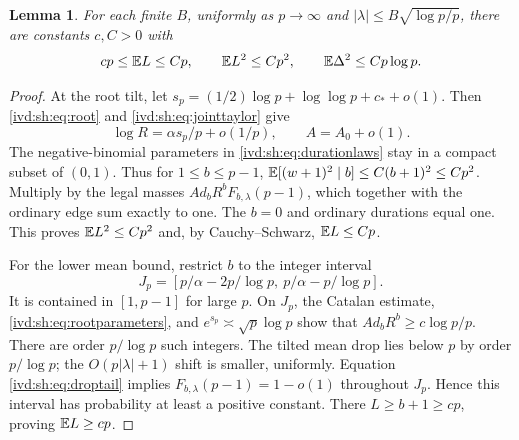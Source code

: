 \documentclass[11pt,letterpaper]{article}
\newtheorem{lemma}[theorem]{Lemma}
\theoremstyle{remark}\newtheorem{remark}[theorem]{Remark}
\numberwithin{equation}{section}
\begin{document}
\begin{lemma}\label{ivd:sh:lem:moments}
For each finite $B$, uniformly as $p\to\infty$ and
$|\lambda|\le B\sqrt{\log p/p}$, there are constants $c,C>0$ with
\begin{equation}\label{ivd:sh:eq:moments}
 cp\le\mathbb E L\le Cp,\qquad
 \mathbb E L^2\le Cp^2,\qquad \mathbb E\Delta^2\le Cp\log p.
\end{equation}
\end{lemma}
\begin{proof}
At the root tilt, let
$s_p=(1/2)\log p+\log\log p+c_*+o(1)$.
Then \eqref{ivd:sh:eq:root} and \eqref{ivd:sh:eq:jointtaylor} give
\begin{equation}\label{ivd:sh:eq:rootparameters}
 \log R=\alpha s_p/p+o(1/p),\qquad A=A_0+o(1).
\end{equation}
The negative-binomial parameters in \eqref{ivd:sh:eq:durationlaws} stay in a
compact subset of $(0,1)$. Thus for $1\le b\le p-1$,
$\mathbb E[(w+1)^2\mid b]\le C(b+1)^2\le Cp^2$.
Multiply by the legal masses
$A d_b R^b F_{b,\lambda}(p-1)$, which together with the ordinary edge
sum exactly to one. The $b=0$ and ordinary durations equal one.
This proves $\mathbb E L^2\le Cp^2$ and, by Cauchy--Schwarz, $\mathbb E L\le Cp$.

For the lower mean bound, restrict $b$ to the integer interval
\begin{equation}\label{ivd:sh:eq:activeinterval}
 J_p=[p/\alpha-2p/\log p,\ p/\alpha-p/\log p].
\end{equation}
It is contained in $[1,p-1]$ for large $p$. On $J_p$, the Catalan
estimate, \eqref{ivd:sh:eq:rootparameters}, and
$e^{s_p}\asymp\sqrt p\log p$ show that
$A d_b R^b\ge c\log p/p$. There are order $p/\log p$ such integers.
The tilted mean drop lies below $p$ by order $p/\log p$; the
$O(p|\lambda|+1)$ shift is smaller, uniformly. Equation
\eqref{ivd:sh:eq:droptail} implies $F_{b,\lambda}(p-1)=1-o(1)$ throughout
$J_p$. Hence this interval has probability at least a positive
constant. There $L\ge b+1\ge cp$, proving $\mathbb E L\ge cp$.


\end{proof}
\end{document}
